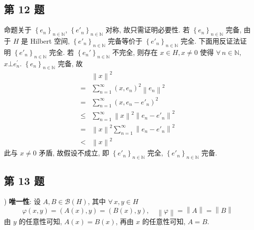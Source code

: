\documentclass[../main.tex]{subfiles}
\begin{document}
\subsection{第 12 题}
命题关于 $\left\{ e_n \right\}_{n \in \mathbb{N}}$, $\left\{ e'_n \right\}_{n \in \mathbb{N}}$ 对称, 故只需证明必要性.
若 $\left\{ e_n \right\}_{n \in \mathbb{N}}$ 完备, 由于 $H$ 是 Hilbert 空间, $\left\{ e'_n \right\}_{n \in \mathbb{N}}$ 完备等价于 $\left\{ e'_n \right\}_{n \in \mathbb{N}}$ 完全.
下面用反证法证明 $\left\{ e'_n \right\}_{n \in \mathbb{N}}$ 完全.
若 $\left\{ e_n{'} \right\}_{n \in \mathbb{N}}$ 不完全, 则存在 $x \in H, x \neq 0$ 使得 $\forall \, n \in \mathbb{N}$, $x \bot e_n^{'}$.
$\left\{ e_n \right\}_{n \in \mathbb{N}}$ 完备, 故
\begin{align*}
     & \left\| x \right\|^2 \\
    =& \sum_{n = 1}^{\infty} \left( x, e_n \right)^2 \left\| e_n \right\|^2 \\
    =& \sum_{n = 1}^{\infty} \left( x, e_n - e'_n \right)^2 \\
    \leqslant & \sum_{n = 1}^{\infty} \left\| x \right\|^2 \left\| e_n - e'_n \right\|^2 \\
    =& \left\| x \right\|^2 \sum_{n = 1}^{\infty} \left\| e_n - e'_n \right\|^2 \\
    <& \left\| x \right\|^2
\end{align*}
此与 $x \neq 0$ 矛盾, 故假设不成立, 即 $\left\{ e'_n \right\}_{n \in \mathbb{N}}$ 完全, $\left\{ e'_n \right\}_{n \in \mathbb{N}}$ 完备.

\subsection{第 13 题}
) \textbf{唯一性}:
设 $A, B \in \mathscr{B} \left( H \right)$, 其中 $\forall \, x, y \in H$
\[
    \varphi \left( x, y \right) = \left( A \left( x \right), y \right) = \left( B \left( x \right), y \right)
    , \quad
    \left\| \varphi \right\| = \left\| A \right\| = \left\| B \right\|
\]
由 $y$ 的任意性可知, $A \left( x \right) = B \left( x \right)$, 再由 $x$ 的任意性可知, $A = B$.
\end{document}

